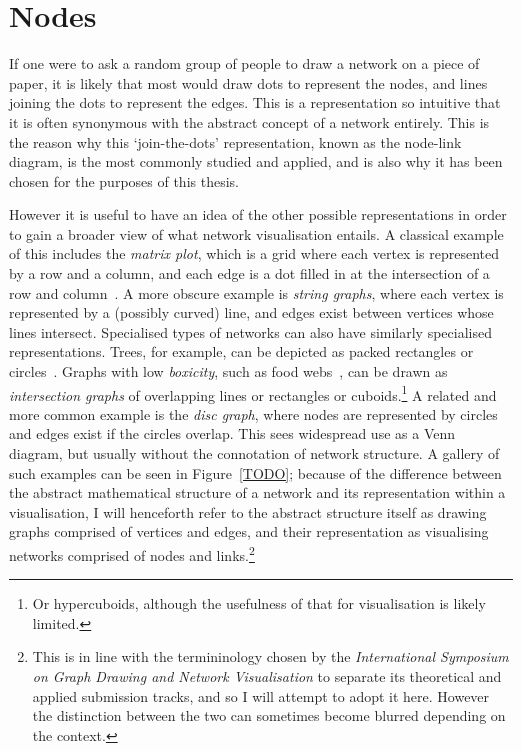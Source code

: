 \chapter{Nodes}
If one were to ask a random group of people to draw a network on a piece of paper, it is likely that most would draw dots to represent the nodes, and lines joining the dots to represent the edges. This is a representation so intuitive that it is often synonymous with the abstract concept of a network entirely.
This is the reason why this `join-the-dots' representation, known as the node-link diagram, is the most commonly studied and applied, and is also why it has been chosen for the purposes of this thesis.

However it is useful to have an idea of the other possible representations in order to gain a broader view of what network visualisation entails. A classical example of this includes the \emph{matrix plot}, which is a grid where each vertex is represented by a row and a column, and each edge is a dot filled in at the intersection of a row and column~\cite{TODO}.
A more obscure example is \emph{string graphs}, where each vertex is represented by a (possibly curved) line, and edges exist between vertices whose lines intersect.
Specialised types of networks can also have similarly specialised representations. Trees, for example, can be depicted as packed rectangles or circles~\cite{TODO}.
Graphs with low \emph{boxicity}, such as food webs~\cite{TODO}, can be drawn as \emph{intersection graphs} of overlapping lines or rectangles or cuboids.\footnote{Or hypercuboids, although the usefulness of that for visualisation is likely limited.}
A related and more common example is the \emph{disc graph}, where nodes are represented by circles and edges exist if the circles overlap. This sees widespread use as a Venn diagram, but usually without the connotation of network structure.
A gallery of such examples can be seen in Figure~\ref{TODO}; because of the difference between the abstract mathematical structure of a network and its representation within a visualisation, I will henceforth refer to the abstract structure itself as drawing graphs comprised of vertices and edges, and their representation as visualising networks comprised of nodes and links.\footnote{This is in line with the termininology chosen by the \emph{International Symposium on Graph Drawing and Network Visualisation} to separate its theoretical and applied submission tracks, and so I will attempt to adopt it here. However the distinction between the two can sometimes become blurred depending on the context.}

